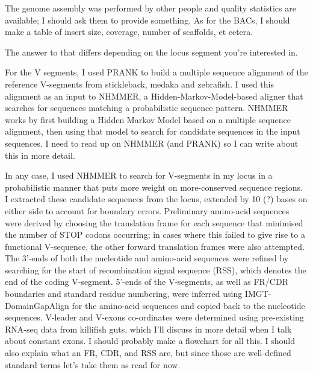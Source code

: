 
The genome assembly was performed by other people and quality statistics are available; I should ask them to provide something. As for the BACs, I should make a table of insert size, coverage, number of scaffolds, et cetera.


The answer to that differs depending on the locus segment you're interested in.

For the V segments, I used PRANK to build a multiple sequence alignment of the reference V-segments from stickleback, medaka and zebrafish. I used this alignment as an input to NHMMER, a Hidden-Markov-Model-based aligner that searches for sequences matching a probabilistic sequence pattern. NHMMER works by first building a Hidden Markov Model based on a multiple sequence alignment, then using that model to search for candidate sequences in the input sequences. I need to read up on NHMMER (and PRANK) so I can write about this in more detail.

In any case, I used NHMMER to search for V-segments in my locus in a probabilistic manner that puts more weight on more-conserved sequence regions. I extracted these candidate sequences from the locus, extended by 10 (?) bases on either side to account for boundary errors. Preliminary amino-acid sequences were derived by choosing the translation frame for each sequence that minimised the number of STOP codons occurring; in cases where this failed to give rise to a functional V-sequence, the other forward translation frames were also attempted. The 3'-ends of both the nucleotide and amino-acid sequences were refined by searching for the start of recombination signal sequence (RSS), which denotes the end of the coding V-segment. 5'-ends of the V-segments, as well as FR/CDR boundaries and standard residue numbering, were inferred using IMGT-DomainGapAlign for the amino-acid sequences and copied back to the nucleotide sequences. V-leader and V-exons co-ordinates were determined using pre-existing RNA-seq data from killifish guts, which I'll discuss in more detail when I talk about constant exons. I should probably make a flowchart for all this. I should also explain what an FR, CDR, and RSS are, but since those are well-defined standard terms let's take them as read for now.

